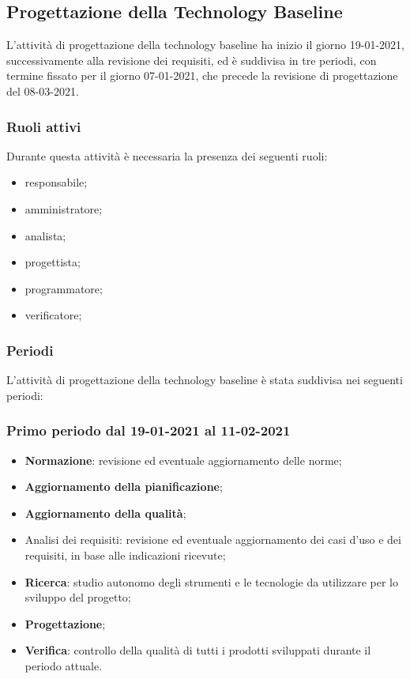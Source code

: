 	\newpage
	
	\subsection{Progettazione della Technology Baseline}
	L’attività di progettazione della technology baseline ha inizio il giorno 19-01-2021, successivamente
	alla revisione dei requisiti, ed è suddivisa in tre periodi, con termine fissato per il giorno 07-01-2021,
	che precede la revisione di progettazione del 08-03-2021.
	
	\subsubsection{Ruoli attivi}
	Durante questa attività è necessaria la presenza dei seguenti ruoli:
	\begin{itemize}
	\item responsabile;
	\item amministratore;
	\item analista;
	\item progettista;
	\item programmatore;
	\item verificatore;
	\end{itemize}

	\subsubsection{Periodi}
	L’attività di progettazione della technology baseline è stata suddivisa nei seguenti periodi:
	
	\subsubsection{Primo periodo dal 19-01-2021 al 11-02-2021}
	\begin{itemize}
	\item \textbf{Normazione}: revisione ed eventuale aggiornamento delle norme;
	\item \textbf{Aggiornamento della pianificazione};
	\item \textbf{Aggiornamento della qualità};
	\item {Analisi dei requisiti}: revisione ed eventuale aggiornamento dei casi d’uso e dei requisiti, in base
	alle indicazioni ricevute;
	\item \textbf{Ricerca}: studio autonomo degli strumenti e le tecnologie da utilizzare per lo sviluppo del
	progetto;
	\item \textbf{Progettazione};
	\item \textbf{Verifica}: controllo della qualità di tutti i prodotti sviluppati durante il periodo attuale.
	\end{itemize}

